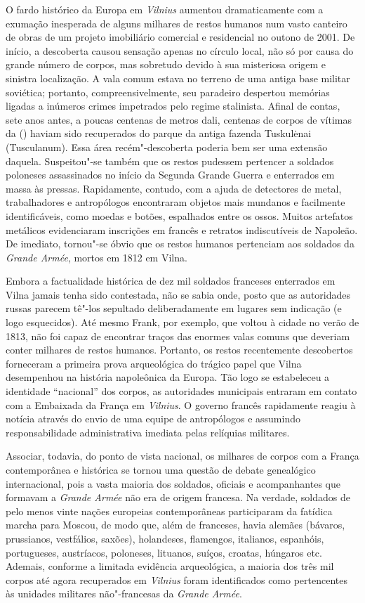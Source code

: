 O fardo histórico da Europa em \textit{Vilnius} aumentou dramaticamente com a
exumação inesperada de alguns milhares de restos humanos num vasto
canteiro de obras de um projeto imobiliário comercial e residencial no
outono de 2001. De início, a descoberta causou sensação apenas no
círculo local, não só por causa do grande número de corpos, mas
sobretudo devido à sua misteriosa origem e sinistra localização. A vala
comum estava no terreno de uma antiga base militar soviética; portanto,
compreensivelmente, seu paradeiro despertou memórias ligadas a inúmeros
crimes impetrados pelo regime stalinista. Afinal de contas, sete anos
antes, a poucas centenas de metros dali, centenas de corpos de vítimas
da  () haviam sido recuperados do parque da antiga fazenda
Tuskulėnai (Tusculanum). Essa área recém"-descoberta poderia bem ser uma
extensão daquela. Suspeitou"-se também que os restos pudessem pertencer a
soldados poloneses assassinados no início da Segunda Grande Guerra e
enterrados em massa às pressas. Rapidamente, contudo, com a ajuda de
detectores de metal, trabalhadores e antropólogos encontraram objetos
mais mundanos e facilmente identificáveis, como moedas e botões,
espalhados entre os ossos. Muitos artefatos metálicos evidenciaram
inscrições em francês e retratos indiscutíveis de Napoleão. De imediato,
tornou"-se óbvio que os restos humanos pertenciam aos soldados da
\textit{Grande Armée}, mortos em 1812 em Vilna.

Embora a factualidade histórica de dez mil soldados franceses enterrados
em Vilna jamais tenha sido contestada, não se sabia onde, posto que as
autoridades russas parecem tê"-los sepultado deliberadamente em lugares
sem indicação (e logo esquecidos). Até mesmo Frank, por exemplo, que
voltou à cidade no verão de 1813, não foi capaz de encontrar traços das
enormes valas comuns que deveriam conter milhares de restos humanos.
Portanto, os restos recentemente descobertos forneceram a primeira prova
arqueológica do trágico papel que Vilna desempenhou na história
napoleônica da Europa. Tão logo se estabeleceu a identidade ``nacional''
dos corpos, as autoridades municipais entraram em contato com a
Embaixada da França em \textit{Vilnius}. O governo francês rapidamente reagiu à
notícia através do envio de uma equipe de antropólogos e assumindo
responsabilidade administrativa imediata pelas relíquias militares.

Associar, todavia, do ponto de vista nacional, os milhares de corpos com
a França contemporânea e histórica se tornou uma questão de debate
genealógico internacional, pois a vasta maioria dos soldados, oficiais e
acompanhantes que formavam a \textit{Grande Armée} não era de origem
francesa. Na verdade, soldados de pelo menos vinte nações europeias
contemporâneas participaram da fatídica marcha para Moscou, de modo que,
além de franceses, havia alemães (bávaros, prussianos, vestfálios,
saxões), holandeses, flamengos, italianos, espanhóis, portugueses,
austríacos, poloneses, lituanos, suíços, croatas, húngaros etc. Ademais,
conforme a limitada evidência arqueológica, a maioria dos três mil
corpos até agora recuperados em \textit{Vilnius} foram identificados como
pertencentes às unidades militares não"-francesas da \textit{Grande Armée}.

